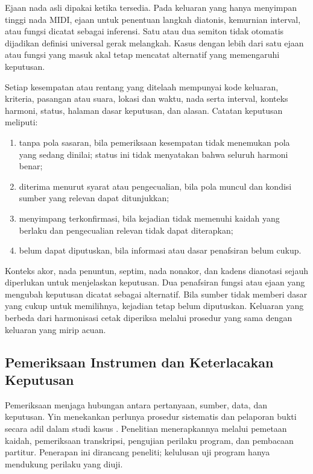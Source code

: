 Ejaan nada asli dipakai ketika tersedia. Pada keluaran yang hanya menyimpan tinggi nada MIDI, ejaan untuk penentuan langkah diatonis, kemurnian interval, atau fungsi dicatat sebagai inferensi. Satu atau dua semiton tidak otomatis dijadikan definisi universal gerak melangkah. Kasus dengan lebih dari satu ejaan atau fungsi yang masuk akal tetap mencatat alternatif yang memengaruhi keputusan.

Setiap kesempatan atau rentang yang ditelaah mempunyai kode keluaran, kriteria, pasangan atau suara, lokasi dan waktu, nada serta interval, konteks harmoni, status, halaman dasar keputusan, dan alasan. Catatan keputusan meliputi:

\begin{enumerate}
    \item tanpa pola sasaran, bila pemeriksaan kesempatan tidak menemukan pola yang sedang dinilai; status ini tidak menyatakan bahwa seluruh harmoni benar;
    \item diterima menurut syarat atau pengecualian, bila pola muncul dan kondisi sumber yang relevan dapat ditunjukkan;
    \item menyimpang terkonfirmasi, bila kejadian tidak memenuhi kaidah yang berlaku dan pengecualian relevan tidak dapat diterapkan;
    \item belum dapat diputuskan, bila informasi atau dasar penafsiran belum cukup.
\end{enumerate}

Konteks akor, nada penuntun, septim, nada nonakor, dan kadens dianotasi sejauh diperlukan untuk menjelaskan keputusan. Dua penafsiran fungsi atau ejaan yang mengubah keputusan dicatat sebagai alternatif. Bila sumber tidak memberi dasar yang cukup untuk memilihnya, kejadian tetap belum diputuskan. Keluaran yang berbeda dari harmonisasi cetak diperiksa melalui prosedur yang sama dengan keluaran yang mirip acuan.

\subsection{Pemeriksaan Instrumen dan Keterlacakan Keputusan}\label{sec:validitas-dan-reliabilitas}

Pemeriksaan menjaga hubungan antara pertanyaan, sumber, data, dan keputusan. Yin menekankan perlunya prosedur sistematis dan pelaporan bukti secara adil dalam studi kasus \parencite[18--20]{yin2018}. Penelitian menerapkannya melalui pemetaan kaidah, pemeriksaan transkripsi, pengujian perilaku program, dan pembacaan partitur. Penerapan ini dirancang peneliti; kelulusan uji program hanya mendukung perilaku yang diuji.

